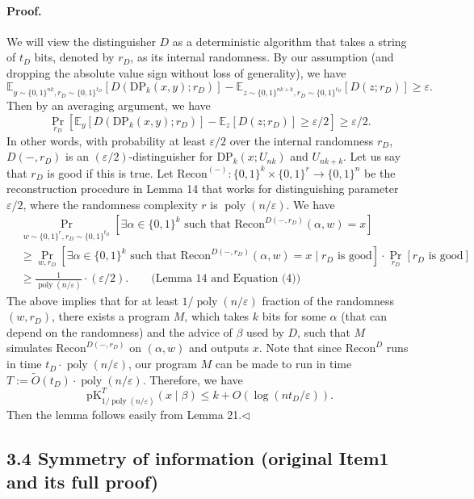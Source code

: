 \documentclass[10pt,a4paper]{article}
\begin{document}
\paragraph{Proof.} We will view the distinguisher $D$ as a deterministic algorithm that takes a string of $t_D$ bits, denoted by $r_D$, as its internal randomness. By our assumption (and dropping the absolute value sign without loss of generality), we have
\[\mathbb E_{y\sim\{0,1\}^{nk},r_D\sim\{0,1\}^{t_D}}[D(\mathrm{DP}_k(x,y);r_D)]-\mathbb E_{z\sim\{0,1\}^{nk+k},r_D\sim\{0,1\}^{t_D}}[D(z;r_D)]\geq\varepsilon.\]
Then by an averaging argument, we have
\[\Pr_{r_D}\left[\mathbb E_y[D(\mathrm{DP}_k(x,y);r_D)]-\mathbb E_z[D(z;r_D)]\geq\varepsilon/2\right]\geq\varepsilon/2.\tag{4}\]
In other words, with probability at least $\varepsilon/2$ over the internal randomness $r_D$, $D(-,r_D)$ is an $(\varepsilon/2)$-distinguisher for $\mathrm{DP}_k(x;U_{nk})$ and $U_{nk+k}$. Let us say that $r_D$ is good if this is true.
Let $\mathrm{Recon}^{(-)}:\{0,1\}^k\times\{0,1\}^r\to\{0,1\}^n$ be the reconstruction procedure in Lemma 14 that works for distinguishing parameter $\varepsilon/2$, where the randomness complexity $r$ is $\operatorname{poly}(n/\varepsilon)$. We have
\begin{align*}
&\Pr_{w\sim\{0,1\}^r,r_D\sim\{0,1\}^{t_D}}[\exists\alpha\in\{0,1\}^k\text{ such that }\mathrm{Recon}^{D(-,r_D)}(\alpha,w)=x]\\
&\geq\Pr_{w,r_D}[\exists\alpha\in\{0,1\}^k\text{ such that }\mathrm{Recon}^{D(-,r_D)}(\alpha,w)=x\mid r_D\text{ is good}]\cdot\Pr_{r_D}[r_D\text{ is good}]\\
&\geq\frac1{\operatorname{poly}(n/\varepsilon)}\cdot(\varepsilon/2).\qquad\text{(Lemma 14 and Equation (4))}
\end{align*}
The above implies that for at least $1/\operatorname{poly}(n/\varepsilon)$ fraction of the randomness $(w,r_D)$, there exists a program $M$, which takes $k$ bits for some $\alpha$ (that can depend on the randomness) and the advice of $\beta$ used by $D$, such that $M$ simulates $\mathrm{Recon}^{D(-,r_D)}$ on $(\alpha,w)$ and outputs $x$. Note that since $\mathrm{Recon}^D$ runs in time $t_D\cdot\operatorname{poly}(n/\varepsilon)$, our program $M$ can be made to run in time $T:=\widetilde O(t_D)\cdot\operatorname{poly}(n/\varepsilon)$. Therefore, we have
\[\mathrm{pK}_{1/\operatorname{poly}(n/\varepsilon)}^T(x\mid\beta)\leq k+O(\log(nt_D/\varepsilon)).\]
Then the lemma follows easily from Lemma 21.\hfill$\triangleleft$

\subsection*{3.4 Symmetry of information (original Item1 and its full proof)}
\end{document}
